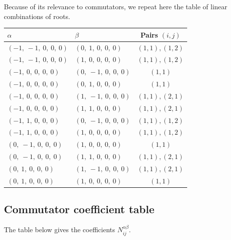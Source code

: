 \documentclass[11pt]{article}
\newcommand{\noi}{\noindent}
\theoremstyle{definition}
\begin{document}
\noi Because of its relevance to commutators, we repeat here the table of linear combinations of roots.

\begin{tabular}{|l|l|c|}
    \hline
    $\alpha$ & $\beta$ & Pairs $(i,j)$ \\
    \hline
    $\left( -1, \  -1, \  0, \  0, \  0\right)$ & $\left( 0, \  1, \  0, \  0, \  0\right)$ & $(1,1), (1,2)$ \\
    \hline
    $\left( -1, \  -1, \  0, \  0, \  0\right)$ & $\left( 1, \  0, \  0, \  0, \  0\right)$ & $(1,1), (1,2)$ \\
    \hline
    $\left( -1, \  0, \  0, \  0, \  0\right)$ & $\left( 0, \  -1, \  0, \  0, \  0\right)$ & $(1,1)$ \\
    \hline
    $\left( -1, \  0, \  0, \  0, \  0\right)$ & $\left( 0, \  1, \  0, \  0, \  0\right)$ & $(1,1)$ \\
    \hline
    $\left( -1, \  0, \  0, \  0, \  0\right)$ & $\left( 1, \  -1, \  0, \  0, \  0\right)$ & $(1,1), (2,1)$ \\
    \hline
    $\left( -1, \  0, \  0, \  0, \  0\right)$ & $\left( 1, \  1, \  0, \  0, \  0\right)$ & $(1,1), (2,1)$ \\
    \hline
    $\left( -1, \  1, \  0, \  0, \  0\right)$ & $\left( 0, \  -1, \  0, \  0, \  0\right)$ & $(1,1), (1,2)$ \\
    \hline
    $\left( -1, \  1, \  0, \  0, \  0\right)$ & $\left( 1, \  0, \  0, \  0, \  0\right)$ & $(1,1), (1,2)$ \\
    \hline
    $\left( 0, \  -1, \  0, \  0, \  0\right)$ & $\left( 1, \  0, \  0, \  0, \  0\right)$ & $(1,1)$ \\
    \hline
    $\left( 0, \  -1, \  0, \  0, \  0\right)$ & $\left( 1, \  1, \  0, \  0, \  0\right)$ & $(1,1), (2,1)$ \\
    \hline
    $\left( 0, \  1, \  0, \  0, \  0\right)$ & $\left( 1, \  -1, \  0, \  0, \  0\right)$ & $(1,1), (2,1)$ \\
    \hline
    $\left( 0, \  1, \  0, \  0, \  0\right)$ & $\left( 1, \  0, \  0, \  0, \  0\right)$ & $(1,1)$ \\
    \hline
\end{tabular}


\subsection{Commutator coefficient table}

\noi The table below gives the coefficients $N_{ij}^{\alpha\beta}$.
\end{document}

